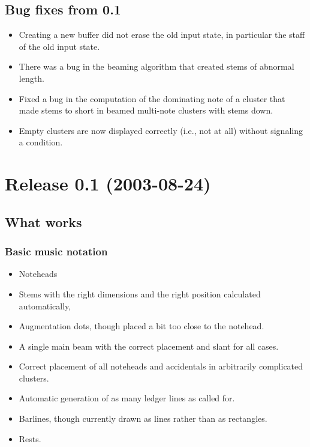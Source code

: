 \subsection{Bug fixes from 0.1}
\begin{itemize}
\item Creating a new buffer did not erase the old input state, in
  particular the staff of the old input state. 
\item There was a bug in the beaming algorithm that created stems of
  abnormal length. 
\item Fixed a bug in the computation of the dominating note of a
  cluster that made stems to short in beamed multi-note clusters with
  stems down.
\item Empty clusters are now displayed correctly (i.e., not at all)
  without signaling a condition. 
\end{itemize}

\section{Release 0.1 (2003-08-24)}

\subsection{What works}

\subsubsection{Basic music notation}

\begin{itemize}
\item Noteheads
\item Stems with the right dimensions and the right position
  calculated automatically, 
\item Augmentation dots, though placed a bit too close to the
  notehead. 
\item A single main beam with the correct placement and slant for all
  cases. 
\item Correct placement of all noteheads and accidentals in
  arbitrarily complicated clusters. 
\item Automatic generation of as many ledger lines as called for.
\item Barlines, though currently drawn as lines rather than as
  rectangles. 
\item Rests.
\end{itemize}

